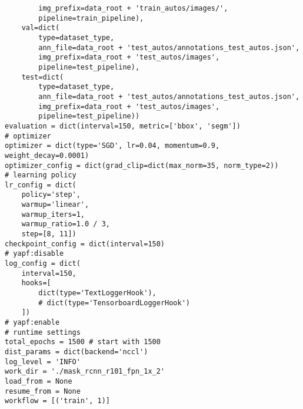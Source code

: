 \begin{verbatim}
        img_prefix=data_root + 'train_autos/images/',
        pipeline=train_pipeline),
    val=dict(
        type=dataset_type,
        ann_file=data_root + 'test_autos/annotations_test_autos.json',
        img_prefix=data_root + 'test_autos/images',
        pipeline=test_pipeline),
    test=dict(
        type=dataset_type,
        ann_file=data_root + 'test_autos/annotations_test_autos.json',
        img_prefix=data_root + 'test_autos/images',
        pipeline=test_pipeline))
evaluation = dict(interval=150, metric=['bbox', 'segm'])
# optimizer
optimizer = dict(type='SGD', lr=0.04, momentum=0.9, weight_decay=0.0001)
optimizer_config = dict(grad_clip=dict(max_norm=35, norm_type=2))
# learning policy
lr_config = dict(
    policy='step',
    warmup='linear',
    warmup_iters=1,
    warmup_ratio=1.0 / 3,
    step=[8, 11])
checkpoint_config = dict(interval=150)
# yapf:disable
log_config = dict(
    interval=150,
    hooks=[
        dict(type='TextLoggerHook'),
        # dict(type='TensorboardLoggerHook')
    ])
# yapf:enable
# runtime settings
total_epochs = 1500 # start with 1500
dist_params = dict(backend='nccl')
log_level = 'INFO'
work_dir = './mask_rcnn_r101_fpn_1x_2'
load_from = None
resume_from = None
workflow = [('train', 1)]

\end{verbatim}